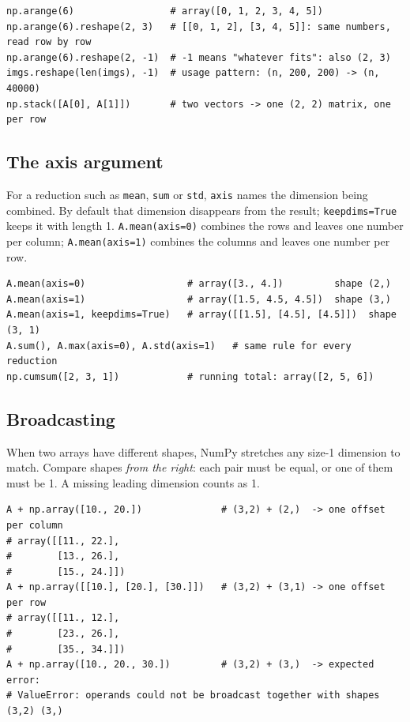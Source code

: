 \documentclass[11pt]{article}
\begin{document}
\begin{codebox}
\begin{verbatim}
np.arange(6)                 # array([0, 1, 2, 3, 4, 5])
np.arange(6).reshape(2, 3)   # [[0, 1, 2], [3, 4, 5]]: same numbers, read row by row
np.arange(6).reshape(2, -1)  # -1 means "whatever fits": also (2, 3)
imgs.reshape(len(imgs), -1)  # usage pattern: (n, 200, 200) -> (n, 40000)
np.stack([A[0], A[1]])       # two vectors -> one (2, 2) matrix, one per row
\end{verbatim}
\end{codebox}

\subsection{The axis argument}

\begin{keybox}
 For a reduction such as \texttt{mean}, \texttt{sum} or
\texttt{std}, \texttt{axis} names the dimension being combined. By default that dimension
disappears from the result; \texttt{keepdims=True} keeps it with length 1.
\texttt{A.mean(axis=0)} combines the rows and leaves one number per column;
\texttt{A.mean(axis=1)} combines the columns and leaves one number per row.
\end{keybox}

\begin{codebox}
\begin{verbatim}
A.mean(axis=0)                  # array([3., 4.])         shape (2,)
A.mean(axis=1)                  # array([1.5, 4.5, 4.5])  shape (3,)
A.mean(axis=1, keepdims=True)   # array([[1.5], [4.5], [4.5]])  shape (3, 1)
A.sum(), A.max(axis=0), A.std(axis=1)   # same rule for every reduction
np.cumsum([2, 3, 1])            # running total: array([2, 5, 6])
\end{verbatim}
\end{codebox}

\subsection{Broadcasting}\label{sec:broadcast}

When two arrays have different shapes, NumPy stretches any size-1 dimension to match.
Compare shapes \emph{from the right}: each pair must be equal, or one of them must be 1.
A missing leading dimension counts as 1.

\begin{codebox}
\begin{verbatim}
A + np.array([10., 20.])              # (3,2) + (2,)  -> one offset per column
# array([[11., 22.],
#        [13., 26.],
#        [15., 24.]])
A + np.array([[10.], [20.], [30.]])   # (3,2) + (3,1) -> one offset per row
# array([[11., 12.],
#        [23., 26.],
#        [35., 34.]])
A + np.array([10., 20., 30.])         # (3,2) + (3,)  -> expected error:
# ValueError: operands could not be broadcast together with shapes (3,2) (3,)
\end{verbatim}
\end{codebox}
\end{document}
